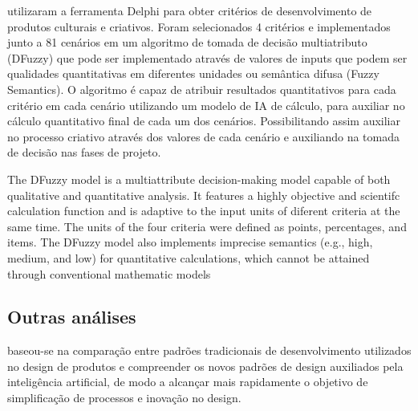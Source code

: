  utilizaram a ferramenta Delphi para obter critérios de desenvolvimento de produtos culturais e criativos. Foram selecionados 4 critérios e implementados junto a 81 cenários em um algoritmo de tomada de decisão multiatributo (DFuzzy) que pode ser implementado através de valores de inputs que podem ser qualidades quantitativas em diferentes unidades ou semântica difusa (Fuzzy Semantics). O algoritmo é capaz de atribuir resultados quantitativos para cada critério em cada cenário utilizando um modelo de IA de cálculo, para auxiliar no cálculo quantitativo final de cada um dos cenários. Possibilitando assim auxiliar no processo criativo através dos valores de cada cenário e auxiliando na tomada de decisão nas fases de projeto.

The DFuzzy model is a multiattribute decision-making model capable of both qualitative and quantitative analysis. It features a highly objective and scientifc calculation function and is adaptive to the input units of diferent criteria at the same time. The units of the four criteria were defined as points, percentages, and items. The DFuzzy model also implements imprecise semantics (e.g., high, medium, and low) for quantitative calculations, which cannot be attained through conventional mathematic models


\subsection*{Outras análises}

 baseou-se na comparação entre padrões tradicionais de desenvolvimento utilizados no design de produtos e compreender os novos padrões de design auxiliados pela inteligência artificial, de modo a alcançar mais rapidamente o objetivo de simplificação de processos e inovação no design.

